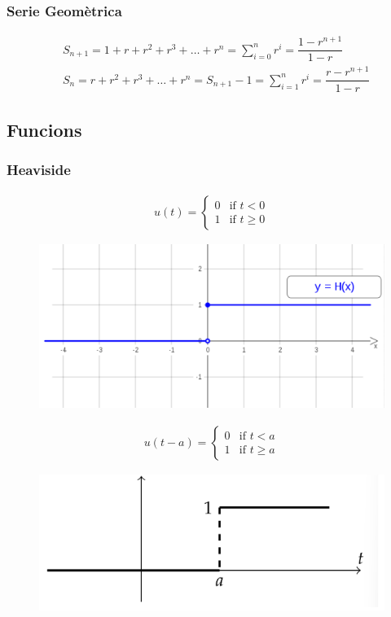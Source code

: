 \documentclass{article}
\begin{document}
\subsubsection{Serie Geomètrica} \label{eqn:sgeometrica}

\begin{align*}
&S_{n+1} = 1 + r + r^2 + r^3 + \ldots + r^n =  \sum_{i=0}^{n} r^{i} = \dfrac{1-r^{n+1}}{1-r} \\
&S_{n} = r + r^2 + r^3 + \ldots + r^n =  S_{n+1} - 1 = \sum_{i=1}^{n} r^{i} = \dfrac{r-r^{n+1}}{1-r}
\end{align*}

\subsection{Funcions}

\subsubsection{Heaviside} \label{heaviside}
\begin{align*}
u(t) =
\left\{
	\begin{array}{ll}
		0  & \mbox{if } t < 0 \\
		  1 & \mbox{if } t \geq 0
	\end{array}
\right.
\end{align*}
\begin{figure}[H]
    \includegraphics[scale=0.6]{pictures/image6.png}
    \centering
\end{figure}
\begin{align*}
u(t-a) =
\left\{
	\begin{array}{ll}
		0  & \mbox{if } t < a \\
		  1 & \mbox{if } t \geq a
	\end{array}
\right.
\end{align*}

\begin{figure}[H]
    \includegraphics[scale=0.6]{pictures/image5.png}
    \centering
\end{figure}
\end{document}
